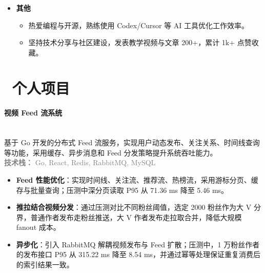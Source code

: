 \documentclass{styles/resume}
\begin{document}
\begin{minipage}{\textwidth}
\begin{itemize}
    \item \textbf{其他}
    \begin{itemize}
        \item 热爱编程与开源，熟练使用 Codex/Cursor 等 AI 工具优化工作效率。
        \item 坚持技术分享与社区建设，发表教学视频与文章 200+，累计 1k+ 点赞收藏。
    \end{itemize}
\end{itemize}

\section[个人项目]{\faCode\ 个人项目}
\paragraph*{视频 Feed 流系统}\mbox{}\\
{\small
\noindent 基于 Go 开发的分布式 Feed 流服务，实现用户动态发布、关注关系、时间线查询等功能，采用缓存、异步消息和 Feed 分发策略提升系统吞吐能力。\\
\noindent\textcolor{gray}{\textbf{技术栈：} Go, React, Redis, RabbitMQ, MySQL}
}
\vspace{0.3ex}

\begin{itemize}
    \item \textbf{Feed 性能优化}：实现时间线、关注流、推荐流、热榜流，采用游标分页、缓存与批量查询；压测中深分页读取 P95 从 71.36 ms 降至 5.46 ms。
    \item \textbf{推拉结合视频分发}：通过压测对比不同粉丝阈值，选定 2000 粉丝作为大 V 分界，普通作者发布走粉丝推送，大 V 作者发布走拉取合并，降低大规模 fanout 成本。
    \item \textbf{异步化}：引入 RabbitMQ 解耦视频发布与 Feed 扩散；压测中，1 万粉丝作者的发布接口 P95 从 315.22 ms 降至 8.54 ms，并通过幂等处理保证重复消费后的索引结果一致。
\end{itemize}

\end{minipage}\par
\vspace*{\fill}
\newpage
\vspace*{\fill}
\end{document}
